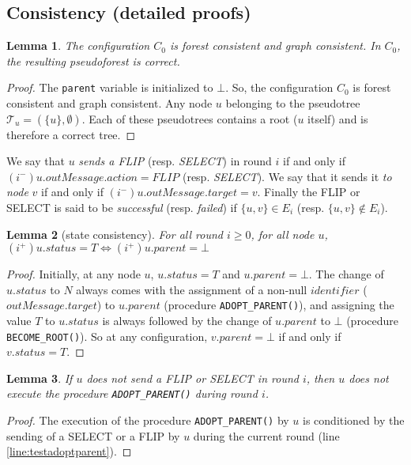 \documentclass[twocolumn]{article}
\newtheorem{lemma}{Lemma}
\newcommand{\state}[3]{\ensuremath{(#2^{#3})#1}}
\newcommand{\uim}{\state{u}{i}{-}}
\newcommand{\uip}{\state{u}{i}{+}}
\newcommand{\T}{\mathcal{T}}
\begin{document}
\subsection{Consistency (detailed proofs)}
\begin{lemma}
  \label{lem:C0-forestConsistency}
  \label{lem:initial_forest}
The configuration $C_0$ is forest consistent and graph consistent.
In $C_0$, the resulting pseudoforest is correct.
\end{lemma}
\begin{proof}
  The {\tt parent} variable is initialized to $\bot$. So, the configuration $C_0$ is forest consistent and graph consistent.
Any node $u$ belonging to the pseudotree $\T_u=(\{u\},\emptyset)$. 
Each of these pseudotrees contains  a root ($u$ itself) and is therefore a correct tree.
 \end{proof}






We say that $u$ {\em sends a FLIP} (resp. {\em SELECT}) in round $i$ if and only if $\uim.outMessage.action=FLIP$ (resp. {\em SELECT}). We say that it sends it {\em to node} $v$ if and only if $\uim.outMessage.target=v$. Finally the FLIP or SELECT is said to be {\em successful} (resp. {\em failed}) if $\{u,v\}\in E_i$ (resp. $\{u,v\}\notin E_i$).
 
\begin{lemma}[state consistency]
\label{lem:L5}
For all round $i \geq 0$, for all node $u$,
$\uip.status = T \Leftrightarrow \uip.parent = \bot$
\end{lemma}

\begin{proof}
Initially, at any node $u$, $u.status=T$ and $u.parent=\bot$. The change of $u.status$ to $N$ always comes with the assignment of a non-null $identifier$ ($outMessage.target$) to $u.parent$ (procedure \texttt{ADOPT\_PARENT()}), and assigning the value $T$ to $u.status$ is always followed by the change of $u.parent$ to $\bot$ (procedure \texttt{BECOME\_ROOT()}). So at any configuration, $v.parent=\bot$ if and only if $v.status=T$.
 \end{proof}


\begin{lemma}
  \label{lem:FLIP-PROCEDURE}
  If $u$ does not send a FLIP or SELECT in round $i$, then $u$ does not execute
the procedure \texttt{ADOPT\_PARENT()} during round $i$.
\end{lemma}

\begin{proof}
The execution of the procedure \texttt{ADOPT\_PARENT()} by $u$
is conditioned by the sending of a SELECT or a FLIP by $u$ during the current round (line \ref{line:testadoptparent}).
 \end{proof}
\end{document}

